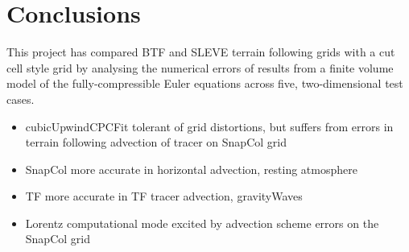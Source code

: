 \chapter{Conclusions}
This project has compared BTF and SLEVE terrain following grids with a cut cell style grid by analysing the numerical errors of results from a finite volume model of the fully-compressible Euler equations across five, two-dimensional test cases.

\begin{itemize}
\item cubicUpwindCPCFit tolerant of grid distortions, but suffers from errors in terrain following advection of tracer on SnapCol grid
\item SnapCol more accurate in horizontal advection, resting atmosphere
\item TF more accurate in TF tracer advection, gravityWaves
\item Lorentz computational mode excited by advection scheme errors on the SnapCol grid
\end{itemize}
